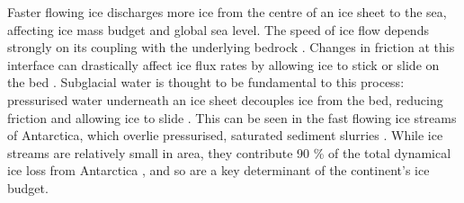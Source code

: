 \documentclass[journal abbreviation, manuscript]{copernicus}
\begin{document}




\introduction  %
 Faster flowing ice discharges more ice from the centre of an ice sheet to the sea, affecting ice mass budget and global sea level. The speed of ice flow depends strongly on its coupling with the underlying bedrock \citep[e.g.][]{rose1979characteristics,engelhardt1990physical}. Changes in friction at this interface can drastically affect ice flux rates by allowing ice to stick or slide on the bed \citep{budd1979empirical}. Subglacial water is thought to be fundamental to this process:
 pressurised water underneath an ice sheet decouples ice from the bed, reducing friction and allowing ice to slide \citep{weertman1957sliding,iken1986combined, alley1989water}. This can be seen in the fast flowing ice streams of Antarctica, which overlie pressurised, saturated sediment slurries \citep{blankenship1986seismic, alley1986deformation, alley1987till,  robin1970radio, engelhardt1997basal,kamb2001basal, hodson2016physical}. While ice streams are relatively small in area, they contribute 90 \% of the total dynamical ice loss from  Antarctica \citep{bamber2000widespread, rignot2011ice}, and so are a key determinant of the continent's ice budget. 
\end{document}
